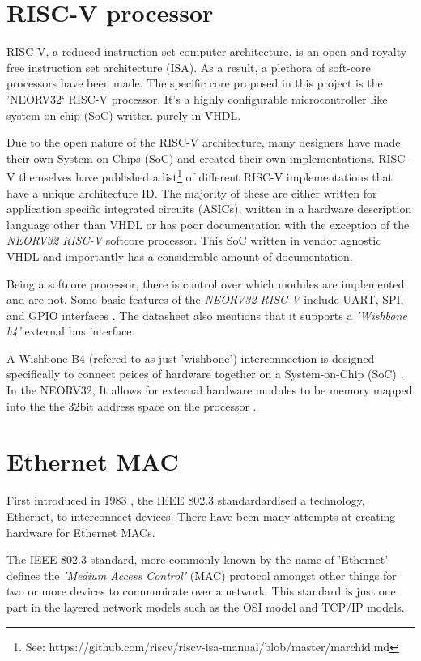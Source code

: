 \section{RISC-V processor}
RISC-V, a reduced instruction set computer architecture, is an open and royalty free instruction set architecture (ISA). As a result, a plethora 
of soft-core processors have been made. The specific core proposed in this project is the 'NEORV32` RISC-V processor. It's a highly configurable 
microcontroller like system on chip (SoC) written purely in VHDL.


Due to the open nature of the RISC-V architecture, many designers have made their own System on Chips (SoC) and created their own implementations. RISC-V 
themselves have published a list\footnote[1]{See: https://github.com/riscv/riscv-isa-manual/blob/master/marchid.md} of different RISC-V implementations 
that have a unique architecture ID. The majority of these are either written for application specific integrated circuits (ASICs), written in a hardware 
description language other than VHDL or has poor documentation with the exception of the  \textit{NEORV32 RISC-V} softcore processor. This SoC written 
in vendor agnostic VHDL and importantly has a considerable amount of documentation. 

Being a softcore processor, there is control over which modules are implemented and are not. Some basic features of the \textit{NEORV32 RISC-V} include 
UART, SPI, and GPIO interfaces \cite{neorv32Datasheet}. The datasheet \cite{neorv32Datasheet} also mentions that it supports a \textit{'Wishbone b4'} 
external bus interface. 


A Wishbone B4 (refered to as just 'wishbone') interconnection is designed specifically to connect peices of hardware together on a System-on-Chip (SoC) \cite{WishboneSpec}. In the NEORV32, 
It allows for external hardware modules to be memory mapped into the the 32bit address space on the processor \cite{neorv32Datasheet}.




\section{Ethernet MAC}

First introduced in 1983 \cite{IEEE802.3-2012}, the IEEE 802.3 standardardised a technology, Ethernet, to interconnect devices. There have been 
many attempts at creating hardware for Ethernet MACs. 

The IEEE 802.3 standard\cite{IEEE802.3-2012}, more commonly known by the name of 'Ethernet' defines the \textit{'Medium Access Control'} (MAC) 
protocol amongst other things for two or more devices to communicate over a network. This standard is just one part in the layered network 
models such as the OSI model and TCP/IP models. 






